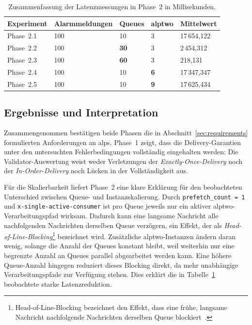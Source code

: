\begin{table}[H]
    \centering
    \caption{Zusammenfassung der Latenzmessungen in Phase~2 in Millisekunden.}
    \label{tab:amqp_exp_phase_2_latency}
    \begin{tabular}{lllll}
        \hline
        Experiment & Alarmmeldungen & Queues      & \gls{alptwo} & Mittelwert  \\
        \hline
        Phase~2.1  & 100            & 10          & 3            & 17\,654,122 \\
        Phase~2.2  & 100            & \textbf{30} & 3            & 2\,454,312  \\
        Phase~2.3  & 100            & \textbf{60} & 3            & 218,131     \\
        Phase~2.4  & 100            & 10          & \textbf{6}   & 17\,347,347 \\
        Phase~2.5  & 100            & 10          & \textbf{9}   & 17\,625,434 \\
        \hline
    \end{tabular}
\end{table}

\subsection{Ergebnisse und Interpretation}

Zusammengenommen bestätigen beide Phasen die in Abschnitt~\ref{sec:requirements} formulierten Anforderungen an \gls{alps}. Phase~1 zeigt, dass die Delivery-Garantien unter den untersuchten Fehlerbedingungen vollständig eingehalten werden: Die Validator-Auswertung weist weder Verletzungen der \textit{Exactly-Once-Delivery} noch der \textit{In-Order-Delivery} noch Lücken in der Vollständigkeit aus.

Für die Skalierbarkeit liefert Phase~2 eine klare Erklärung für den beobachteten Unterschied zwischen Queue- und Instanzskalierung. Durch \texttt{prefetch\_count = 1} und \texttt{x-single-active-consumer} ist pro Queue jeweils nur ein aktiver \gls{alptwo}-Verarbeitungspfad wirksam. Dadurch kann eine langsame Nachricht alle nachfolgenden Nachrichten derselben Queue verzögern, ein Effekt, der als \textit{Head-of-Line-Blocking}\footnote{Head-of-Line-Blocking bezeichnet den Effekt, dass eine frühe, langsame Nachricht nachfolgende Nachrichten derselben Queue blockiert~\citep{kurose2017computer}.} bezeichnet wird. Zusätzliche \gls{alptwo}-Instanzen ändern daran wenig, solange die Anzahl der Queues konstant bleibt, weil weiterhin nur eine begrenzte Anzahl an Queues parallel abgearbeitet werden kann. Eine höhere Queue-Anzahl hingegen reduziert dieses Blocking direkt, da mehr unabhängige Verarbeitungspfade zur Verfügung stehen. Dies erklärt die in Tabelle~\ref{tab:amqp_exp_phase_2_latency} beobachtete starke Latenzreduktion.

